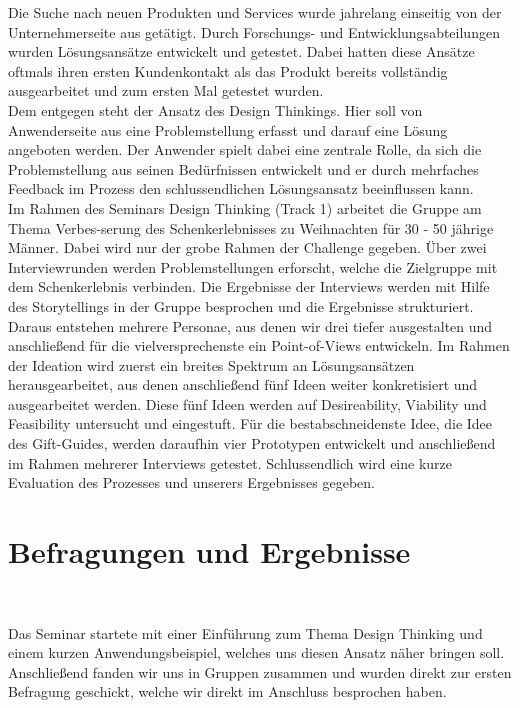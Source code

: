 \documentclass[12pt,ngerman, fleqn]{book} %
\begin{document}
Die Suche nach neuen Produkten und Services wurde jahrelang einseitig von der Unternehmerseite aus getätigt. Durch Forschungs- und Entwicklungsabteilungen wurden Lösungsansätze entwickelt und getestet. Dabei hatten diese Ansätze oftmals ihren ersten Kundenkontakt als das Produkt bereits vollständig ausgearbeitet und zum ersten Mal getestet wurden. \\
Dem entgegen steht der Ansatz des Design Thinkings. Hier soll von Anwenderseite aus eine Problemstellung erfasst und darauf eine Lösung angeboten werden. Der Anwender spielt dabei eine zentrale Rolle, da sich die Problemstellung aus seinen Bedürfnissen entwickelt und er durch mehrfaches Feedback im Prozess den schlussendlichen Lösungsansatz beeinflussen kann. \\
Im Rahmen des Seminars Design Thinking (Track 1) arbeitet die Gruppe am Thema Verbes-serung des Schenkerlebnisses zu Weihnachten für 30 - 50 jährige Männer. Dabei wird nur der grobe Rahmen der Challenge gegeben. Über zwei Interviewrunden werden Problemstellungen erforscht, welche die Zielgruppe mit dem Schenkerlebnis verbinden. Die Ergebnisse der Interviews werden mit Hilfe des Storytellings in der Gruppe besprochen und die Ergebnisse strukturiert. Daraus entstehen mehrere Personae, aus denen wir drei tiefer ausgestalten und anschließend für die vielversprechenste ein Point-of-Views entwickeln. Im Rahmen der Ideation wird zuerst ein breites Spektrum an Lösungsansätzen herausgearbeitet, aus denen anschließend fünf Ideen weiter konkretisiert und ausgearbeitet werden. Diese fünf Ideen werden auf Desireability, Viability und Feasibility untersucht und eingestuft. Für die bestabschneidenste Idee, die Idee des Gift-Guides, werden daraufhin vier Prototypen entwickelt und anschließend im Rahmen mehrerer Interviews getestet. Schlussendlich wird eine kurze Evaluation des Prozesses und unserers Ergebnisses gegeben.


\chapter{Befragungen und Ergebnisse}\\
\setcounter{page}{2}

Das Seminar startete mit einer Einführung zum Thema Design Thinking und einem kurzen Anwendungsbeispiel, welches uns diesen Ansatz näher bringen soll. Anschließend fanden wir uns in Gruppen zusammen und wurden direkt zur ersten Befragung geschickt, welche wir direkt im Anschluss besprochen haben. \\
\end{document}
